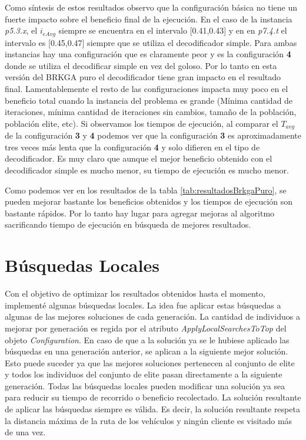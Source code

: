 \bigskip

Como síntesis de estos resultados observo que la configuración básica no tiene un fuerte impacto sobre el beneficio final de la ejecución. En el caso de la instancia \textit{p5.3.x}, el $i_{eAvg}$ siempre se encuentra en el intervalo [0.41,0.43] y en en \textit{p7.4.t} el intervalo es [0.45,0.47] siempre que se utiliza el decodificador simple. Para ambas instancias hay una configuración que es claramente peor y es la configuración \textbf{4} donde se utiliza el decodificar simple en vez del goloso. Por lo tanto en esta versión del BRKGA puro el decodificador tiene gran impacto en el resultado final. Lamentablemente el resto de las configuraciones impacta muy poco en el beneficio total cuando la instancia del problema es grande (Mínima cantidad de iteraciones, mínima cantidad de iteraciones sin cambios, tamaño de la población, población elite, etc). Si observamos los tiempos de ejecución, al comparar el $T_{avg}$ de la configuración \textbf{3} y \textbf{4} podemos ver que la configuración \textbf{3} es aproximadamente tres veces más lenta que la configuración \textbf{4} y solo difieren en el tipo de decodificador. Es muy claro que aunque el mejor beneficio obtenido con el decodificador simple es mucho menor, su tiempo de ejecución es mucho menor.

\bigskip

Como podemos ver en los resultados de la tabla \ref{tab:resultadosBrkgaPuro}, se pueden mejorar bastante los beneficios obtenidos y los tiempos de ejecución son bastante rápidos. Por lo tanto hay lugar para agregar mejoras al algoritmo sacrificando tiempo de ejecución en búsqueda de mejores resultados.

\bigskip

\section{Búsquedas Locales}

Con el objetivo de optimizar los resultados obtenidos hasta el momento, implementé algunas búsquedas locales. La idea fue aplicar estas búsquedas a algunas de las mejores soluciones de cada generación. La cantidad de individuos a mejorar por generación es regida por el atributo \textit{ApplyLocalSearchesToTop} del objeto \textit{Configuration}. En caso de que a la solución ya se le hubiese aplicado las búsquedas en una generación anterior, se aplican a la siguiente mejor solución. Esto puede suceder ya que las mejores soluciones pertenecen al conjunto de elite y todos los individuos del conjunto de elite pasan directamente a la siguiente generación. Todas las búsquedas locales pueden modificar una solución ya sea para reducir su tiempo de recorrido o beneficio recolectado. La solución resultante de aplicar las búsquedas siempre es válida. Es decir, la solución resultante respeta la distancia máxima de la ruta de los vehículos y ningún cliente es visitado más de una vez. 

